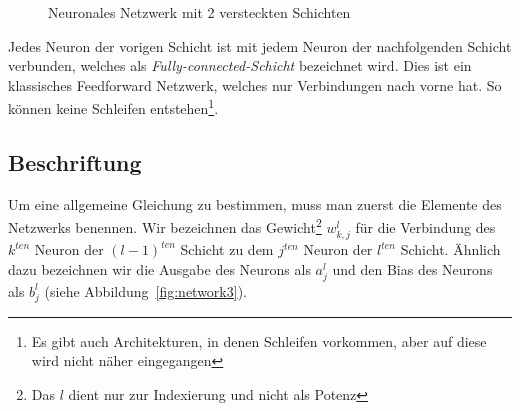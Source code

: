 \documentclass[12pt,a4paper]{report}
\begin{document}
\begin{figure}[h]
    \caption{Neuronales Netzwerk mit 2 versteckten Schichten}
    \label{fig:network2}
\end{figure}
Jedes Neuron der vorigen Schicht ist mit jedem Neuron der nachfolgenden Schicht verbunden,
welches als \textit{Fully-connected-Schicht} bezeichnet wird.
Dies ist ein klassisches Feedforward Netzwerk,
welches nur Verbindungen nach vorne hat. So können keine Schleifen entstehen\footnote{Es gibt auch Architekturen, in denen Schleifen vorkommen,
aber auf diese wird nicht näher eingegangen}.

\subsection{Beschriftung}

Um eine allgemeine Gleichung zu bestimmen, muss man zuerst die Elemente des Netzwerks benennen.
Wir bezeichnen das Gewicht\footnote{Das $l$ dient nur zur Indexierung und nicht als Potenz} $w^l_{k,j}$ für die Verbindung des $k^{ten}$ Neuron der $(l-1)^{ten}$ Schicht
zu dem $j^{ten}$ Neuron der $l^{ten}$ Schicht.
Ähnlich dazu bezeichnen wir die Ausgabe des Neurons als $a^l_j$ und den Bias des Neurons als $b^l_j$ (siehe Abbildung~\ref{fig:network3}).
\end{document}
